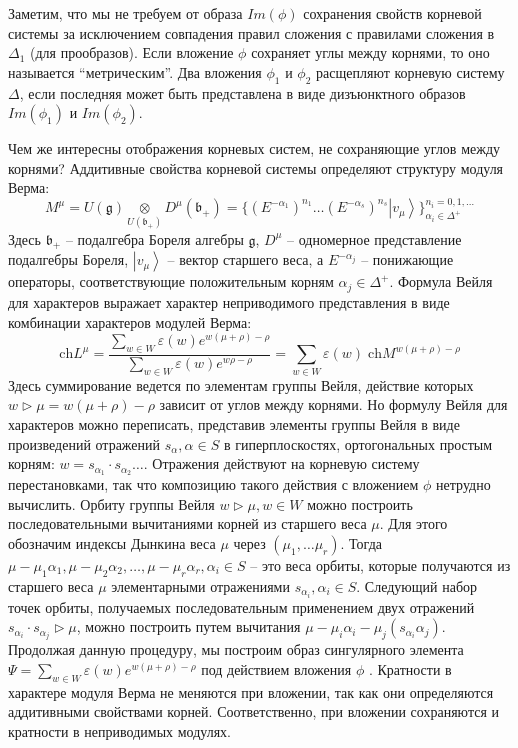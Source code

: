 \documentclass[12pt]{article}
\newcommand{\gf}{\mathfrak{g}}
\newcommand{\bff}{\mathfrak{b}}
\begin{document}
Заметим, что мы не требуем от образа $Im(\phi)$ сохранения свойств корневой системы за исключением
совпадения правил сложения с правилами сложения в $\Delta_{1}$ (для прообразов). Если вложение
$\phi$ сохраняет углы между корнями, то оно называется ``метрическим''. Два вложения $\phi_1$ и
$\phi_2$ расщепляют корневую систему $\Delta$, если последняя может быть представлена в виде
дизъюнктного образов $Im(\phi_1)$ и $Im(\phi_2)$.

Чем же интересны отображения корневых систем, не сохраняющие углов между корнями? Аддитивные
свойства корневой системы определяют структуру модуля Верма:
    \begin{equation*}
      M^{\mu}=U(\gf)\underset{U(\bff_{+})}{\otimes} D^{\mu}(\bff_{+})=\{(E^{-\alpha_{1}})^{n_{1}}\dots (E^{-\alpha_{s}})^{n_{s}} \left|v_{\mu}\right>\}_{\alpha_{i}\in\Delta^{+}}^{n_{i}=0,1,\dots}
    \end{equation*}
Здесь $\bff_{+}$ -- подалгебра Бореля алгебры $\gf$, $D^{\mu}$ -- одномерное представление
подалгебры Бореля, $\left|v_{\mu}\right>$ -- вектор старшего веса, а  $E^{-\alpha_{j}}$ --
понижающие операторы, соответствующие положительным корням $\alpha_{j}\in \Delta^{+}$. 
Формула Вейля для характеров выражает характер неприводимого представления в виде комбинации характеров
модулей Верма: 
\begin{equation*}
  \mathrm{ch} L^{\mu}=\frac{\sum_{w\in W} \varepsilon(w) e^{w(\mu+\rho)-\rho}}{\sum_{w\in W}\varepsilon(w) e^{w\rho-\rho}}=\sum_{w\in W} \varepsilon(w)\; \mathrm{ch} M^{w(\mu+\rho)-\rho}
\end{equation*}
Здесь суммирование ведется по элементам группы Вейля, действие которых $w\triangleright \mu
=w(\mu+\rho)-\rho$ зависит от углов между корнями. Но формулу Вейля для характеров можно переписать,
представив элементы группы Вейля в виде произведений отражений $s_{\alpha}, \alpha \in S$ в
гиперплоскостях, ортогональных простым корням: $w=s_{\alpha_{1}}\cdot s_{\alpha_{2}}\dots$.
Отражения действуют на корневую систему перестановками, так что композицию такого действия с
вложением $\phi$ нетрудно вычислить. Орбиту группы Вейля $w\triangleright \mu, w\in W$ можно
построить последовательными вычитаниями корней из старшего веса $\mu$. Для этого обозначим индексы
Дынкина веса $\mu$ через $(\mu_{1},\dots \mu_{r})$. Тогда $\mu-\mu_{1}\alpha_{1},
\mu-\mu_{2}\alpha_{2},\dots, \mu-\mu_{r}\alpha_{r}, \alpha_{i}\in S$ -- это веса орбиты, которые
получаются из старшего веса $\mu$ элементарными отражениями $s_{\alpha_{i}}, \alpha_{i}\in S$.
Следующий набор точек орбиты, получаемых последовательным применением двух отражений
$s_{\alpha_{i}}\cdot s_{\alpha_{j}}\triangleright\mu$, можно построить путем вычитания
$\mu-\mu_{i}\alpha_{i}-\mu_{j} (s_{\alpha_{i}}\alpha_{j})$. Продолжая данную процедуру, мы построим
образ сингулярного элемента $\Psi=\sum_{w\in W} \varepsilon(w) e^{w(\mu+\rho)-\rho}$ под действием
вложения $\phi$ \cite{2011arXiv1111.6787L}. Кратности в характере модуля Верма не меняются при
вложении, так как они определяются аддитивными свойствами корней. Соответственно, при вложении
сохраняются и кратности в неприводимых модулях.
\end{document}
